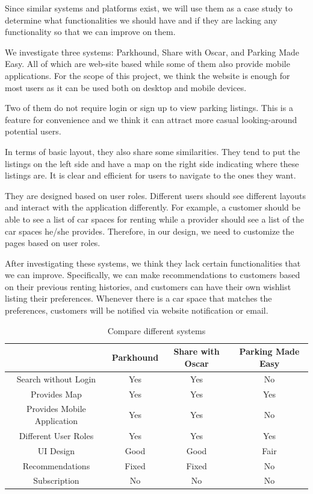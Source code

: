 \documentclass[12pt]{article}
\begin{document}
  Since similar systems and platforms exist, we will use them as a case study to determine what functionalities we should have and if they are lacking any functionality so that we can improve on them.

  We investigate three systems: Parkhound, Share with Oscar, and Parking Made Easy. All of which are web-site based while some of them also provide mobile applications. For the scope of this project, we think the website is enough for most users as it can be used both on desktop and mobile devices.
  
  Two of them do not require login or sign up to view parking listings. This is a feature for convenience and we think it can attract more casual looking-around potential users.
  
  In terms of basic layout, they also share some similarities. They tend to put the listings on the left side and have a map on the right side indicating where these listings are. It is clear and efficient for users to navigate to the ones they want.
  
  They are designed based on user roles. Different users should see different layouts and interact with the application differently. For example, a customer should be able to see a list of car spaces for renting while a provider should see a list of the car spaces he/she provides. Therefore, in our design, we need to customize the pages based on user roles.
  
  After investigating these systems, we think they lack certain functionalities that we can improve. Specifically, we can make recommendations to customers based on their previous renting histories, and customers can have their own wishlist listing their preferences. Whenever there is a car space that matches the preferences, customers will be notified via website notification or email. 
  
  \begin{center}
  \begin{table}[h!]
  \begin{tabular}{ |c|c|c|c| } 
  \hline
    & Parkhound & Share with Oscar & Parking Made Easy\\
  \hline
  Search without Login & Yes & Yes & No\\
  \hline
  Provides Map & Yes & Yes & Yes\\
  \hline
  Provides Mobile Application & Yes & Yes & No\\
  \hline
  Different User Roles & Yes & Yes & Yes\\
  \hline
  UI Design & Good & Good & Fair\\
  \hline
  Recommendations & Fixed & Fixed & No\\
  \hline
  Subscription & No & No & No\\
  \hline
  \end{tabular}
  \caption{Compare different systems}
  \label{table:1}
  \end{table}
  \end{center}
\end{document}
